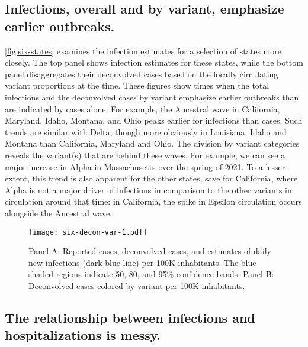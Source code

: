     
\subsection{Infections, overall and by variant, emphasize earlier outbreaks.}
\label{sec:infections-by-voc}

\autoref{fig:six-states} examines the infection estimates for a selection of
states more closely. The top panel shows infection estimates for these states,
while the bottom panel disaggregates their deconvolved cases based on the locally
circulating variant proportions at the time. These figures show times when the
total infections and the deconvolved cases by variant emphasize earlier
outbreaks than are indicated by cases alone. For example, the Ancestral
wave in California, Maryland, Idaho, Montana, and Ohio peaks earlier for
infections than cases. Such trends are similar with Delta, though more obviously
in Louisiana, Idaho and Montana than California, Maryland and Ohio. The division
by variant categories reveals the variant(s) that are behind these waves. For
example, we can see a major increase in Alpha in Massachusetts over the spring
of 2021. To a lesser extent, this trend is also apparent for the other states,
save for California, where Alpha is not a major driver of infections in
comparison to the other variants in circulation around that time: in California,
the spike in Epsilon circulation occurs alongside the Ancestral wave.



\begin{figure}[!tb]
\centering
    \texttt{[image: six-decon-var-1.pdf]}
    \caption{Panel A: Reported cases, deconvolved cases, and estimates of
    daily new infections (dark blue line) per 100K inhabitants. The blue shaded
    regions indicate 50, 80, and 95\% confidence bands.  
    Panel B: Deconvolved cases colored by variant per 100K inhabitants.}
    \label{fig:six-states}
\end{figure}


\subsection{The relationship between infections and hospitalizations is messy.}
\label{sec:lagged-correlations}


